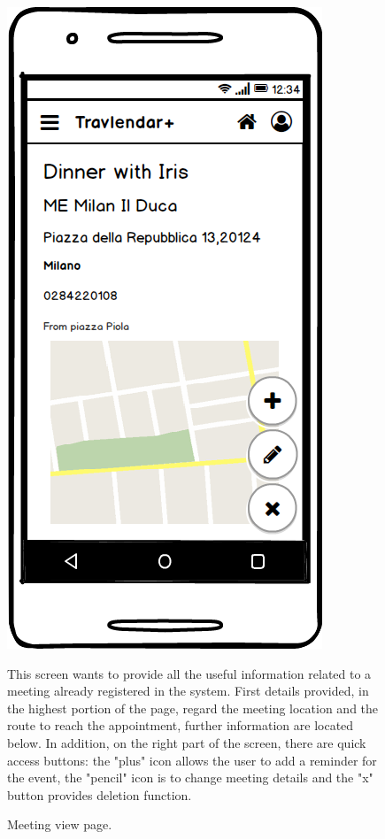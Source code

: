 \documentclass[11pt]{article}
\begin{document}
	\begin{figure}
	\centering
	\includegraphics[width=0.7\linewidth]{MeetingView.png}
	\caption{Meeting view page. }
	\label{fig:meeting-view}
	\begin{center}
		This screen wants to provide all the useful information related to a meeting already registered in the system. First details provided, in the highest portion of the page, regard the meeting location and the route to reach the appointment, further information are located below. In addition, on the right part of the screen, there are quick access buttons: the "plus" icon allows the user to add a reminder for the event, the "pencil" icon is to change meeting details and the "x" button provides deletion function. 
	\end{center}
	\end{figure}
\end{document}
